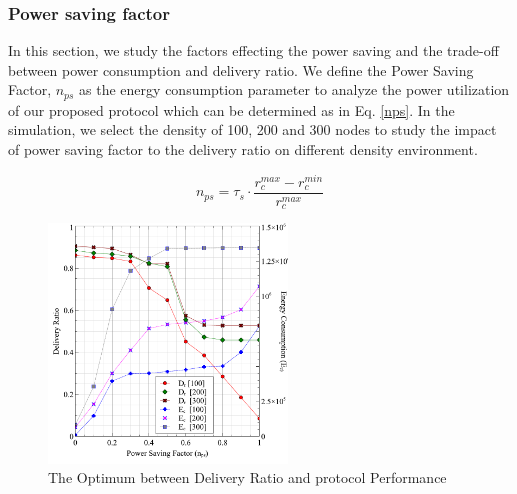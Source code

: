 \documentclass[conference]{IEEEtran}
\begin{document}

\subsubsection{Power saving factor}


In this section, we study the factors effecting the power saving and the trade-off between power consumption and delivery ratio.
We define the Power Saving Factor, $n_{ps}$ as the energy consumption parameter to analyze the power utilization of our proposed protocol which can be determined as in Eq. \ref{nps}.
In the simulation, we select the density of 100, 200 and 300 nodes to study the impact of power saving factor to the delivery ratio on different density environment.

\begin{equation}
{ n }_{ ps }={ \tau  }_{ s }\cdot \frac { { r }_{ c }^{ max }-{ r }_{ c }^{ min } }{ { r }_{ c }^{ max } } 
\label{nps}
\end{equation}

\begin{figure}[!t]
\centering
\includegraphics[width=2.5in]{Graphs/NpsDeliveryPerformanceAndDeliveryRatio.pdf}
\caption{The Optimum between Delivery Ratio and protocol Performance}
\label{The Optimum between Delivery Ratio and protocol Performance}
\end{figure}
\end{document}
